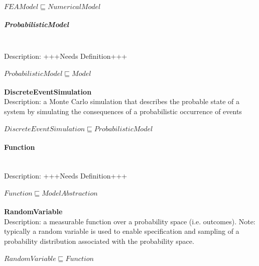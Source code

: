 \\$ FEAModel \sqsubseteq NumericalModel$
\subparagraph{ProbabilisticModel}\\
Description: +++Needs Definition+++\\
\\$ ProbabilisticModel \sqsubseteq Model$
\\\\   \textbf{DiscreteEventSimulation}\\Description: a Monte Carlo simulation that describes the probable state of a system by simulating the consequences of a probabilistic occurrence of events\\
\\$ DiscreteEventSimulation \sqsubseteq ProbabilisticModel$
\paragraph{Function}\\
Description: +++Needs Definition+++\\
\\$ Function \sqsubseteq ModelAbstraction$
\\\\   \textbf{RandomVariable}\\Description: a measurable function over a probability space (i.e. outcomes). Note: typically a random variable is used to enable specification and sampling of a probability distribution associated with the probability space.\\
\\$ RandomVariable \sqsubseteq Function$
